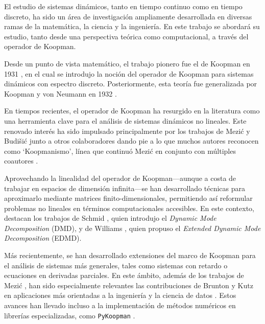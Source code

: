 El estudio de sistemas dinámicos, tanto en tiempo continuo como en tiempo discreto, ha sido un área de investigación ampliamente desarrollada en diversas ramas de la matemática, la ciencia y la ingeniería. En este trabajo se abordará su estudio, tanto desde una perspectiva teórica como computacional, a través del operador de Koopman.  

Desde un punto de vista matemático, el trabajo pionero fue el de Koopman en 1931 \cite{Koopman1931HamiltonianSpace}, en el cual se introdujo la noción del operador de Koopman para sistemas dinámicos con espectro discreto. Posteriormente, esta teoría fue generalizada por Koopman y von Neumann en 1932 \cite{Koopman1932DynamicalSpectra}.  

En tiempos recientes, el operador de Koopman ha resurgido en la literatura como una herramienta clave para el análisis de sistemas dinámicos no lineales. Este renovado interés ha sido impulsado principalmente por los trabajos de Mezić y Budišić junto a otros colaboradores \cite{Budisic2009AnObservables, Budisic2012GeometryFlows, Budisic2012AppliedKoopmanism} dando pie a lo que muchos autores reconocen como `Koopmanismo', línea que continuó Mezić en conjunto con múltiples coautores \cite{Rowley2009SpectralFlows, Susuki2011NonlinearDynamics, Mezic2013AnalysisOperator, Mauroy2013IsostablesDynamics, Lan2013LinearizationSpectrum, Korda2018OnOperator, Korda2018LinearControl, Arbabi2017ErgodicOperator, Arbabi2017StudyDecomposition, Mauroy2020TheControl, Korda2020OptimalControl, Korda2020Data-drivenOperator, Mezic2020SpectrumGeometry, Mezic2022OnOperator, Mezic2024ACases}.  

Aprovechando la linealidad del operador de Koopman—aunque a costa de trabajar en espacios de dimensión infinita—se han desarrollado técnicas para aproximarlo mediante matrices finito-dimensionales, permitiendo así reformular problemas no lineales en términos computacionales accesibles. En este contexto, destacan los trabajos de Schmid \cite{Schmid2008DynamicData}, quien introdujo el \textit{Dynamic Mode Decomposition} (DMD), y de Williams \cite{Williams2015ADecomposition}, quien propuso el \textit{Extended Dynamic Mode Decomposition} (EDMD).  

Más recientemente, se han desarrollado extensiones del marco de Koopman para el análisis de sistemas más generales, tales como sistemas con retardo o ecuaciones en derivadas parciales. En este ámbito, además de los trabajos de Mezić \cite{Mezic2013AnalysisOperator, Mezic2020SpectrumGeometry, Mezic2022OnOperator}, han sido especialmente relevantes las contribuciones de Brunton y Kutz en aplicaciones más orientadas a la ingeniería y la ciencia de datos \cite{Tu2014OnApplications, Brunton2016KoopmanControl, Proctor2018GeneralizingControl, NathanKutz2018AppliedSystems, Lusch2018DeepDynamics, Brunton2019Data-DrivenControl, Kamb2020Time-delayApplications, Kaiser2021Data-drivenControl, Brunton2022ModernSystems, Baddoo2022KernelOptimization, Baddoo2023Physics-informedDecomposition}. Estos avances han llevado incluso a la implementación de métodos numéricos en librerías especializadas, como \texttt{PyKoopman} \cite{Pan2024PyKoopman:Operator}.  


